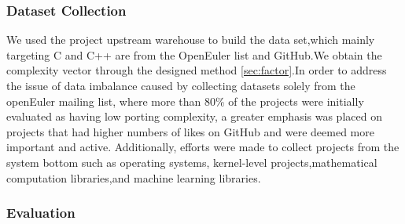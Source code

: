 \documentclass[sigconf,screen,review,anonymous]{acmart}
\begin{document}
{\subsubsection{Dataset Collection}
We used the project upstream warehouse to build the data set,which mainly targeting C and C++ are from the OpenEuler list and GitHub\citep{stage2023}.We obtain the complexity vector through the designed method \ref{sec:factor}.In order to address the issue of data imbalance caused by collecting datasets solely from the openEuler mailing list, where more than 80\% of the projects were initially evaluated as having low porting complexity, a greater emphasis was placed on projects that had higher numbers of likes on GitHub and were deemed more important and active. Additionally, efforts were made to collect projects from the system bottom such as operating systems, kernel-level projects,mathematical computation libraries,and machine learning libraries.

\subsubsection{Evaluation}
  
}
\end{document}
